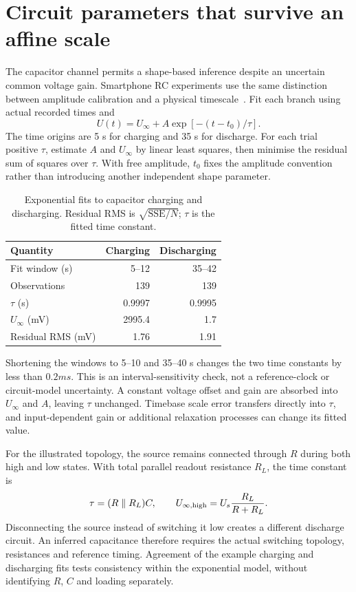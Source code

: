 \section{Circuit parameters that survive an affine scale}
The capacitor channel permits a shape-based inference despite an uncertain common voltage gain. Smartphone RC experiments use the same distinction between amplitude calibration and a physical timescale~\cite{torriente2023rc}. Fit each branch using actual recorded times and
\begin{equation}
 U(t)=U_\infty+A\exp[-(t-t_0)/\tau].
 \label{eq:analog-inputs-rc}
\end{equation}
The time origins are 5 s for charging and 35 s for discharge. For each trial positive $\tau$, estimate $A$ and $U_\infty$ by linear least squares, then minimise the residual sum of squares over $\tau$. With free amplitude, $t_0$ fixes the amplitude convention rather than introducing another independent shape parameter.

\begin{table}[t]
\caption{Exponential fits to capacitor charging and discharging. Residual RMS is $\sqrt{\mathrm{SSE}/N}$; $\tau$ is the fitted time constant.}
\label{tab:analog-inputs-rc}
\centering\small
\begin{tabular}{@{}lrr@{}}
\toprule
Quantity & Charging & Discharging\\
\midrule
Fit window (s) & 5--12 & 35--42\\
Observations & 139 & 139\\
$\tau$ (s) & 0.9997 & 0.9995\\
$U_\infty$ (mV) & 2995.4 & 1.7\\
Residual RMS (mV) & 1.76 & 1.91\\
\bottomrule
\end{tabular}
\end{table}

Shortening the windows to 5--10 and 35--40 s changes the two time constants by less than $0.2\unit{ms}$. This is an interval-sensitivity check, not a reference-clock or circuit-model uncertainty. A constant voltage offset and gain are absorbed into $U_\infty$ and $A$, leaving $\tau$ unchanged. Timebase scale error transfers directly into $\tau$, and input-dependent gain or additional relaxation processes can change its fitted value.

For the illustrated topology, the source remains connected through $R$ during both high and low states. With total parallel readout resistance $R_L$, the time constant is
\begin{equation}
 \tau=(R\parallel R_L)C,
 \qquad U_{\infty,\rm high}=U_s\frac{R_L}{R+R_L}.
 \label{eq:analog-inputs-loaded}
\end{equation}
Disconnecting the source instead of switching it low creates a different discharge circuit. An inferred capacitance therefore requires the actual switching topology, resistances and reference timing. Agreement of the example charging and discharging fits tests consistency within the exponential model, without identifying $R$, $C$ and loading separately.

